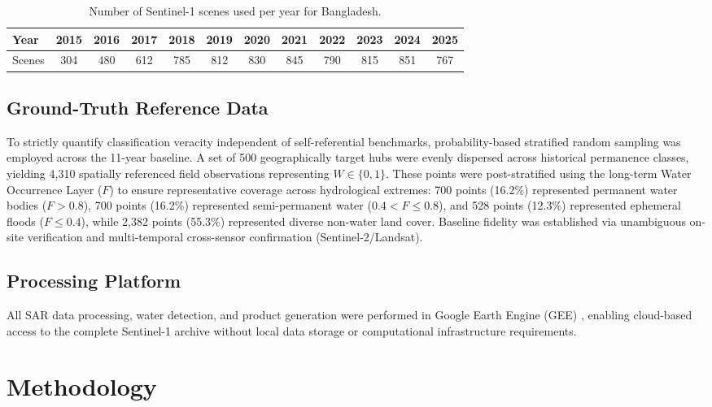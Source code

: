 \documentclass[fleqn,10pt,twocolumn]{article}
\begin{document}
\begin{table}[htbp]
\centering
\caption{Number of Sentinel-1 scenes used per year for Bangladesh.}
\label{tab:s1_count}
\begin{adjustbox}{max width=\linewidth}\begin{tabular}{lccccccccccc}
\toprule
\textbf{Year} & 2015 & 2016 & 2017 & 2018 & 2019 & 2020 & 2021 & 2022 & 2023 & 2024 & 2025 \\
\midrule
Scenes & 304 & 480 & 612 & 785 & 812 & 830 & 845 & 790 & 815 & 851 & 767 \\
\bottomrule
\end{tabular}\end{adjustbox}
\end{table}

\subsection{Ground-Truth Reference Data}
To strictly quantify classification veracity independent of self-referential benchmarks, probability-based stratified random sampling was employed across the 11-year baseline. A set of 500 geographically target hubs were evenly dispersed across historical permanence classes, yielding 4,310 spatially referenced field observations representing $W \in \{0, 1\}$. These points were post-stratified using the long-term Water Occurrence Layer ($F$) to ensure representative coverage across hydrological extremes: 700 points (16.2\%) represented permanent water bodies ($F > 0.8$), 700 points (16.2\%) represented semi-permanent water ($0.4 < F \le 0.8$), and 528 points (12.3\%) represented ephemeral floods ($F \le 0.4$), while 2,382 points (55.3\%) represented diverse non-water land cover. Baseline fidelity was established via unambiguous on-site verification and multi-temporal cross-sensor confirmation (Sentinel-2/Landsat).


\subsection{Processing Platform}
All SAR data processing, water detection, and product generation were performed in Google Earth Engine (GEE) \cite{gorelick2017}, enabling cloud-based access to the complete Sentinel-1 archive without local data storage or computational infrastructure requirements.


\section{Methodology}
\end{document}
